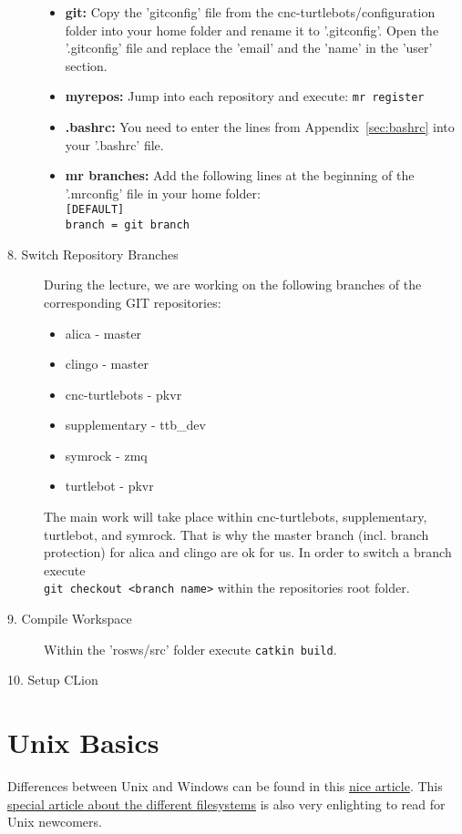 \begin{description}
		\begin{itemize}
			\item \textbf{git:} Copy the 'gitconfig' file from the cnc-turtlebots/configuration folder into your home folder and rename it to '.gitconfig'. Open the '.gitconfig' file and replace the 'email' and the 'name' in the 'user' section.
			\item \textbf{myrepos:} Jump into each repository and execute: \verb#mr register#
			\item \textbf{.bashrc:} You need to enter the lines from Appendix~\ref{sec:bashrc} into your '.bashrc' file.
			\item \textbf{mr branches:} Add the following lines at the beginning of the '.mrconfig' file in your home folder:\\
			\verb#[DEFAULT]#\\
			\verb#branch = git branch#
		\end{itemize}
	\item[8. Switch Repository Branches] During the lecture, we are working on the following branches of the corresponding GIT repositories:
	\begin{itemize}
		\item alica - master
		\item clingo - master
		\item cnc-turtlebots - pkvr
		\item supplementary - ttb\_dev
		\item symrock - zmq
		\item turtlebot - pkvr
	\end{itemize}
	The main work will take place within cnc-turtlebots, supplementary, turtlebot, and symrock. That is why the master branch (incl. branch protection) for alica and clingo are ok for us. In order to switch a branch execute\\\verb#git checkout <branch name># within the repositories root folder.
	\item[9. Compile Workspace] Within the 'rosws/src' folder execute \verb#catkin build#.
	\item[10. Setup CLion]
\end{description}

\section{Unix Basics}
\label{sec:LinuxBasics}

Differences between Unix and Windows can be found in this \href{https://www.techrepublic.com/blog/10-things/10-fundamental-differences-between-linux-and-windows/}{nice article}. This \href{https://www.howtogeek.com/137096/6-ways-the-linux-file-system-is-different-from-the-windows-file-system/}{special article about the different filesystems} is also very enlighting to read for Unix newcomers.

